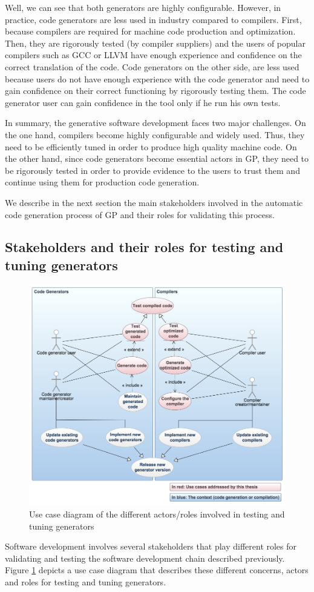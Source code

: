 Well, we can see that both generators are highly configurable. However, in practice, code generators are less used in industry compared to compilers. First, because compilers are required for machine code production and optimization. Then, they are rigorously tested (by compiler suppliers) and the users of popular compilers such as GCC or LLVM have enough experience and confidence on the correct translation of the code. 
Code generators on the other side, are less used because users do not have enough experience with the code generator and need to gain confidence on their correct functioning by rigorously testing them. The code generator user can gain confidence in the tool only if he run his own tests.

In summary, the generative software development faces two major challenges. On the one hand, compilers become highly configurable and widely used. Thus, they need to be efficiently tuned in order to produce high quality machine code. On the other hand, since code generators become essential actors in GP, they need to be rigorously tested in order to provide evidence to the users to trust them and continue using them for production code generation.

We describe in the next section the main stakeholders involved in the automatic code generation process of GP and their roles for validating this process.


\subsection{Stakeholders and their roles for testing and tuning generators}
\begin{figure}[h]
	\center
	\includegraphics[scale=0.45]{Background/fig/usecase}
	\caption{Use case diagram of the different actors/roles involved in testing and tuning generators}
	\label{fig:usecase}
\end{figure}
Software development involves several stakeholders that play different roles for validating and testing the software development chain described previously.
Figure \ref{fig:usecase} depicts a use case diagram that describes these different concerns, actors and roles for testing and tuning generators.

